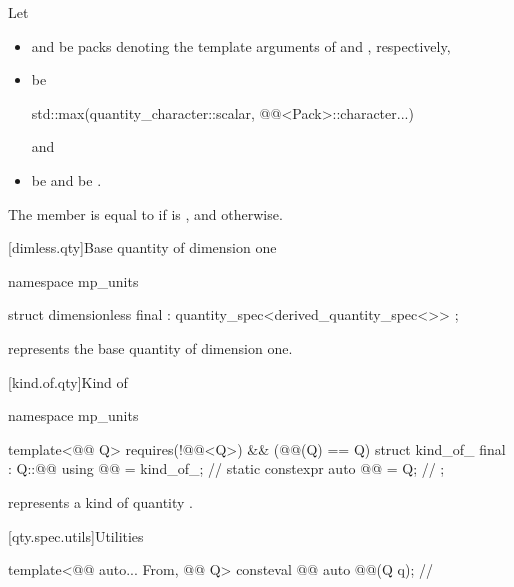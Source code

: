 \pnum
Let
\begin{itemize}
\item
{} and 
be packs denoting the template arguments of
 and , respectively,
\item
{} be
\begin{codeblock}
std::max({quantity_character::scalar, @@<Pack>::character...})
\end{codeblock}
and
\item
{} be  and
 be .
\end{itemize}
The member  is equal to
 if  is , and
 otherwise.

[dimless.qty]{Base quantity of dimension one}

\begin{codeblock}
namespace mp_units {

struct dimensionless final : quantity_spec<derived_quantity_spec<>> {};

}
\end{codeblock}

\pnum
{} represents the base quantity of dimension one.

[kind.of.qty]{Kind of}

\begin{codeblock}
namespace mp_units {

template<@@ Q>
  requires(!@@<Q>) && (@@(Q{}) == Q{})
struct kind_of_ final : Q::@@ {
  using @@ = kind_of_;                 // \expos
  static constexpr auto @@ = Q{};  // \expos
};

}
\end{codeblock}

\pnum
{} represents a kind of quantity .

[qty.spec.utils]{Utilities}

\begin{itemdecl}
template<@@ auto... From, @@ Q>
consteval @@ auto @@(Q q);    // \expos
\end{itemdecl}

